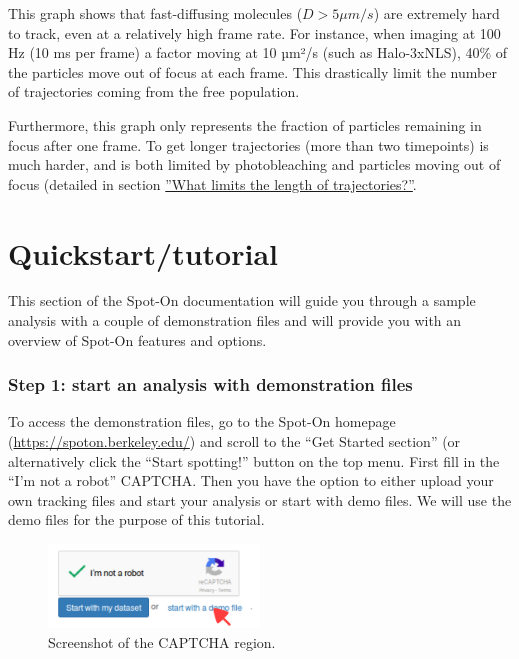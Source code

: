 This graph shows that fast-diffusing molecules (\(D> 5 \mu m/s\)) are extremely hard to track, even at a relatively high frame rate. For instance, when imaging at 100 Hz (10 ms per frame) a factor moving at 10 µm²/s (such as Halo-3xNLS), 40\% of the particles move out of focus at each frame. This drastically limit the number of trajectories coming from the free population.

Furthermore, this graph only represents the fraction of particles remaining in focus after one frame. To get longer trajectories (more than two timepoints) is much harder, and is both limited by photobleaching and particles moving out of focus (detailed in section \href{https://spoton.berkeley.edu/SPTGUI/docs/latest#trajectory-length}{''What limits the length of trajectories?''}.

\newpage

\section{Quickstart/tutorial}
\label{sec:tutorial}

This section of the Spot-On documentation will guide you through a sample analysis with a couple of demonstration files and will provide you with an overview of Spot-On features and options.

\subsubsection{Step 1: start an analysis with demonstration files}
To access the demonstration files, go to the Spot-On homepage (\url{https://spoton.berkeley.edu/}) and scroll to the ``Get Started section'' (or alternatively click the ``Start spotting!'' button on the top menu. First fill in the ``I'm not a robot'' CAPTCHA. Then you have the option to either upload your own tracking files and start your analysis or start with demo files. We will use the demo files for the purpose of this tutorial.

\begin{figure}[h]
\centering
\includegraphics[width=0.5\textwidth]{../SPTGUI/static/SPTGUI/img/tutorial/0.7/tuto1.png}
\caption{\label{fig:tuto1}Screenshot of the CAPTCHA region.}
\end{figure}

